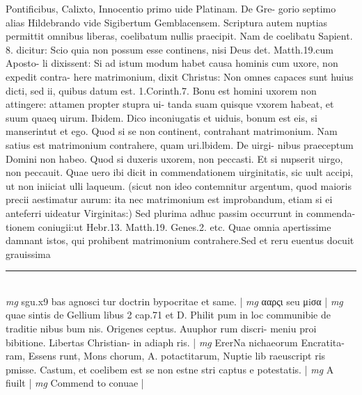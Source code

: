 \documentclass{article}
\begin{document}
\begin{pages}
Pontificibus, Calixto, Innocentio primo uide Platinam. De Gre- gorio septimo alias Hildebrando vide Sigibertum Gemblacensem. Scriptura autem nuptias permittit omnibus liberas, coelibatum nullis praecipit. Nam de coelibatu Sapient. 8. dicitur: Scio quia non possum esse continens, nisi Deus det. Matth.19.cum Aposto- li dixissent: Si ad istum modum habet causa hominis cum uxore, non expedit contra- here matrimonium, dixit Christus: Non omnes capaces sunt huius dicti, sed ii, quibus datum est. 1.Corinth.7. Bonu est homini uxorem non attingere: attamen propter stupra ui- tanda suam quisque vxorem habeat, et suum quaeq uirum. Ibidem. Dico inconiugatis et uiduis, bonum est eis, si manserintut et ego. Quod si se non continent, contrahant matrimonium. Nam satius est matrimonium contrahere, quam uri.lbidem. De uirgi- nibus praeceptum Domini non habeo. Quod si duxeris uxorem, non peccasti. Et si nupserit uirgo, non peccauit. Quae uero ibi dicit in commendationem uirginitatis, sic uult accipi, ut non iniiciat ulli laqueum. (sicut non ideo contemnitur argentum, quod maioris precii aestimatur aurum: ita nec matrimonium est improbandum, etiam si ei anteferri uideatur Virginitas:) Sed plurima adhuc passim occurrunt in commenda- tionem coniugii:ut Hebr.13. Matth.19. Genes.2. etc. Quae omnia apertissime damnant istos, qui prohibent matrimonium contrahere.Sed et reru euentus docuit grauissima  \pend
\vspace{0.5cm}\noindent
\vspace{0.2cm}\rule{1cm}{0.2pt}\\ 
\hspace{0.2cm}\textit{mg}
\footnotesize sgu.x9 bas agnosci tur doctrin bypocritae et same. 
\normalsize| 
\hspace{0.2cm}\textit{mg}
\footnotesize ααρςι seu μiσα 
\normalsize| 
\hspace{0.2cm}\textit{mg}
\footnotesize quae sintis de Gellium libus 2 cap.71 et D. Philit pum in loc communibie de traditie nibus bum nis. Origenes ceptus. Auuphor rum discri- meniu proi bibitione. Libertas Christian- in adiaph ris. 
\normalsize| 
\hspace{0.2cm}\textit{mg}
\footnotesize ErerNa nichaeorum Encratita- ram, Essens runt, Mons chorum, A. potactitarum, Nuptie lib raeuscript ris pmisse. Castum, et coelibem est se non estne stri captus e potestatis. 
\normalsize| 
\hspace{0.2cm}\textit{mg}
\footnotesize A fiuilt 
\normalsize| 
\hspace{0.2cm}\textit{mg}
\footnotesize Commend to conuae 
\normalsize| 

\end{pages}
\end{document}
